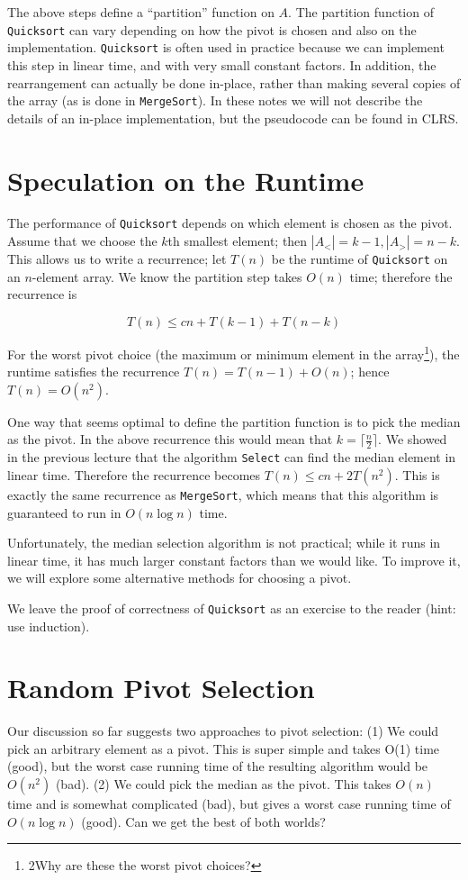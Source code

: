 \documentclass [12pt]{article}
\begin{document}
The above steps define a ``partition'' function on $A$. The partition function of \texttt{Quicksort} can vary depending on how the pivot is chosen and also on the implementation. \texttt{Quicksort} is often used in practice because we can implement this step in linear time, and with very small constant factors. In addition, the rearrangement can actually be done in-place, rather
than making several copies of the array (as is done in \texttt{MergeSort}). In these notes we will
not describe the details of an in-place implementation, but the pseudocode can be found in
CLRS.


\section{Speculation on the Runtime}

The performance of \texttt{Quicksort} depends on which element is chosen as the pivot. Assume
that we choose the $k$th smallest element; then $|A_<| = k - 1, |A_>| = n - k$. This allows us to write a recurrence; let $T(n)$ be the runtime of \texttt{Quicksort} on an $n$-element array. We know the partition step takes $O(n)$ time; therefore the recurrence is

$$
T(n) \leq cn + T(k-1) + T(n-k)
$$

For the worst pivot choice (the maximum or minimum element in the array\footnote{2Why are these the worst pivot choices?}), the runtime satisfies the recurrence $T(n) = T(n - 1) + O(n)$; hence $T(n) = O(n^2)$.

One way that seems optimal to define the partition function is to pick the median as the
pivot. In the above recurrence this would mean that $k = \lceil \frac{n}{2}\rceil$. We showed in the previous lecture that the algorithm \texttt{Select} can find the median element in linear time. Therefore the recurrence becomes $T(n) \leq cn + 2T(n^2)$. This is exactly the same recurrence as \texttt{MergeSort}, which means that this algorithm is guaranteed to run in $O(n \log n)$ time.

Unfortunately, the median selection algorithm is not practical; while it runs in linear time, it
has much larger constant factors than we would like. To improve it, we will explore some
alternative methods for choosing a pivot.

We leave the proof of correctness of \texttt{Quicksort} as an exercise to the reader (hint: use
induction).


\section{Random Pivot Selection}
Our discussion so far suggests two approaches to pivot selection: (1) We could pick an
arbitrary element as a pivot. This is super simple and takes O(1) time (good), but the worst
case running time of the resulting algorithm would be $O(n^2)$ (bad). (2) We could pick the
median as the pivot. This takes $O(n)$ time and is somewhat complicated (bad), but gives a
worst case running time of $O(n \log n)$ (good). Can we get the best of both worlds?
\end{document}
